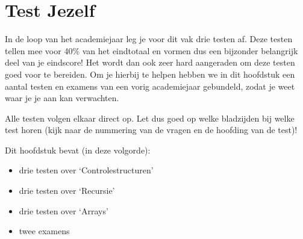 \chapter{Test Jezelf}

In de loop van het academiejaar leg je voor dit vak drie testen af. Deze testen tellen mee voor 40\% van het eindtotaal en vormen dus een bijzonder belangrijk deel van je eindscore! Het wordt dan ook zeer hard aangeraden om deze testen  goed voor te bereiden. Om je hierbij te helpen hebben we in dit hoofdstuk een aantal testen en examens van een vorig academiejaar gebundeld, zodat je weet waar je je aan kan verwachten.

Alle testen volgen elkaar direct op. Let dus goed op welke bladzijden bij welke test horen (kijk naar de nummering van de vragen en de hoofding van de test)!

Dit hoofdstuk bevat (in deze volgorde):

\begin{itemize}
\item drie testen over `Controlestructuren'
\item drie testen over `Recursie'
\item drie testen over `Arrays'
\item twee examens
\end{itemize}















